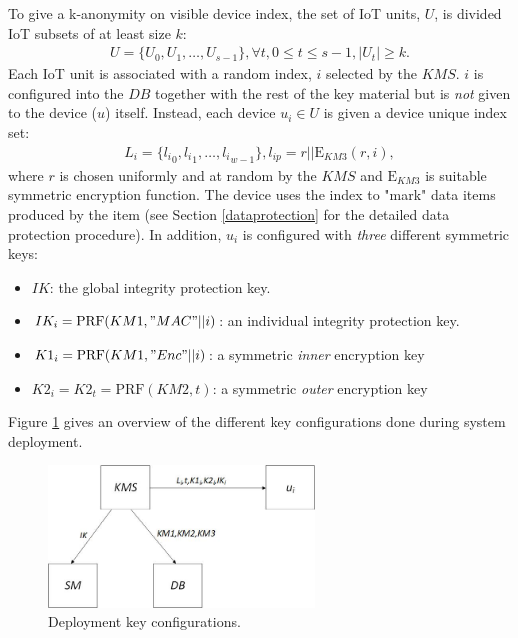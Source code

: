{To give a k-anonymity on visible device index, the set of IoT units, $U$, is divided IoT subsets of at least size $k$:
\begin{eqnarray}
\label{keygen:deviceset}
U = \{U_0,U_1,\ldots, U_{s-1}\}, \forall t, 0 \leq t \leq s-1, |U_t| \geq k.
\end{eqnarray}
Each IoT unit is associated with a random index, $i$ selected by the $KMS$. $i$ is configured into the $DB$ together with the rest of the key material but is \emph{not} given to the device ($u$) itself. Instead, each device $u_i \in U$ is given a device unique index set:
\begin{eqnarray}
\label{keygen:devindex}
L_i = \{{l_i}_0, {l_i}_1,\ldots, {l_i}_{w-1}\}, l_{ip} = r||\text{E}_{KM3}(r,i),
\end{eqnarray}
where $r$ is chosen uniformly and at random by the $KMS$ and $\text{E}_{KM3}$ is suitable symmetric encryption function. The device uses the index to "mark" data items produced by the item (see Section \ref{dataprotection} for the detailed data protection procedure). In addition, $u_i$ is  configured with \emph{three} different symmetric keys:
\begin{itemize}
    \item $IK$: the global integrity protection key.
    \item $IK_i = \text{PRF}(KM1, "MAC"||i)$: an individual integrity protection key.
    \item $K1_i = \text{PRF}(KM1,"Enc"||i)$: a symmetric \emph{inner} encryption key
    \item $K2_i = K2_t = \text{PRF}(KM2,t)$: a symmetric \emph{outer} encryption key
\end{itemize}
Figure \ref{fig:keydist} gives an overview of the different key configurations done during system deployment. 
\begin{figure}[ht]
    \centering
    \includegraphics[width=200pt]{papers/ppiot/images/KeyDist}
    \caption{Deployment key configurations.}
    \label{fig:keydist}
\end{figure}

}
